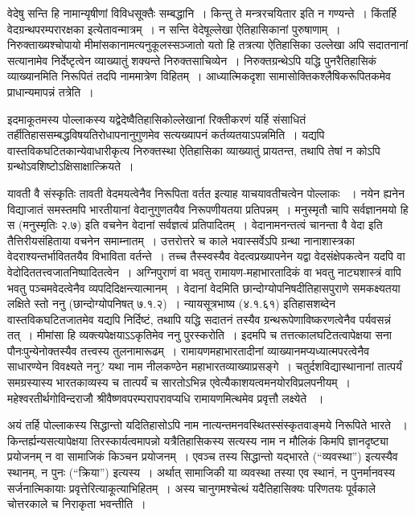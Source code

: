 वेदेषु सन्ति हि नामान्यृषीणां विविधसूक्तैः सम्बद्धानि~। किन्तु ते मन्त्ररचयितार इति न गण्यन्ते~। किंतर्हि वेदग्रन्थपरम्परारक्षका इत्येतावन्मात्रम्~। न सन्ति वेदेषूल्लेखा ऐतिहासिकानां पुरुषाणाम्~। निरुक्ताख्यश्चोपायो मीमांसकानामत्यनुकूलस्सञ्जातो यतो हि तत्रत्या ऐतिहासिका उल्लेखा अपि सदातनानां सत्यानामेव निर्देष्टृत्वेन व्याख्यातुं शक्यन्ते निरुक्तसाचिव्येन~। निरुक्तग्रन्थेऽपि यद्धि पुनरैतिहासिकं व्याख्यानमिति निरूपितं तदपि नाममात्रेण विहितम्~। आध्यात्मिकदृशा सामासोक्तिकश्लैषिकरूपितकमेव प्राधान्यमापन्नं तत्रेति~।

इदमाकूतमस्य पोल्लाकस्य यद्वेदेष्वैतिहासिकोल्लेखानां रिक्तीकरणं यर्हि संसाधितं तर्हीतिहाससम्बद्धविषयतिरोधापनानुगुणमेव सत्यख्यापनं कर्तव्यतयाऽपन्नमिति~।  यद्यपि वास्तविकघटितकान्येवाधारीकृत्य निरुक्तस्था ऐतिहासिका व्याख्यातुं प्रायतन्त, तथापि तेषां न कोऽपि ग्रन्थोऽवशिष्टोऽक्षिसाक्षात्क्रियते~।

यावती वै संस्कृतिः तावती वेदमयत्वेनैव निरूपिता वर्तत इत्याह याचयावतीचत्वेन पोल्लाकः ~। नयेन ह्यनेन विद्याजातं समस्तमपि भारतीयानां वेदानुगुणतयैव निरूपणीयतया प्रतिपन्नम्~। मनुस्मृतौ चापि सर्वज्ञानमयो हि स (मनुस्मृतिः २.७) इति वचनेन वेदानां सर्वज्ञत्वं प्रतिपादितम्~। वेदानामनन्तत्वं चानन्ता वै वेदा इति तैत्तिरीयसंहिताया वचनेन  समाम्नातम्~। उत्तरोत्तरे च काले भवास्सर्वेऽपि ग्रन्था नानाशास्त्रका वेदराश्यन्तर्भाविततयैव विभाविता वर्तन्ते~। तच्च तैस्स्वस्यैव वेदत्वप्रख्यापनेन यद्वा वेदसंक्षेपकत्वेन यदपि वा वेदोदिततत्त्वजातनिष्पादितत्वेन~। अग्निपुराणं वा भवतु रामायण-महाभारतादिकं वा भवतु नाट्यशास्त्रं वापि भवतु पञ्चमवेदत्वेनैव व्यपदिदिक्षन्त्यात्मानम्~। वेदानां वेदमिति छान्दोग्योपनिषदीतिहासपुराणे समकक्ष्यतया लक्षिते स्तो ननु (छान्दोग्योपनिषत् ७.१.२)~। न्यायसूत्रभाष्य (४.१.६१) इतिहासशब्देन वास्तविकघटितजातमेव यद्यपि निर्दिष्टं, तथापि यद्धि सदातनं तस्यैव ग्रन्थरूपेणाविष्करणत्वेनैव पर्यवसन्नं तत्~। मीमांसा हि व्यक्त्यपेक्षयाऽऽकृतिमेव ननु पुरस्करोति~। इदमपि च तत्तत्कालघटितत्वापेक्षया सना पौनःपुन्येनोक्तस्यैव तत्त्वस्य तुलनामारूढम्~। रामायणमहाभारतादीनां व्याख्यानमप्यध्यात्मपरत्वेनैव साधारण्येन विवक्ष्यते ननु? यथा नाम नीलकण्ठेन महाभारतव्याख्याप्रसङ्गे~। चतुर्दशविद्यास्थानानां तात्पर्यं समग्रस्यास्य भारतकाव्यस्य च तात्पर्यं च सारतोऽभिन्न एवेत्यैकाशयत्वमनयोरविप्रलपनीयम्~। महेश्वरतीर्थगोविन्दराजौ श्रीवैष्णवपरम्परापरावप्यधि रामायणमित्थमेव प्रवृत्तौ लक्ष्येते ~।

अयं तर्हि पोल्लाकस्य सिद्धान्तो यदितिहासोऽपि नाम नात्यन्तमनवस्थितस्संस्कृतवाङ्मये निरूपिते भारते ~। किन्तर्ह्यन्यसत्यापेक्षया तिरस्कार्यत्वमापन्नो यत्रैतिहासिकस्य सत्यस्य नाम न मौलिकं किमपि ज्ञानदृष्ट्या प्रयोजनम् न वा सामाजिकं किञ्चन प्रयोजनम्~। एवञ्च तस्य सिद्धान्तो यद्भारते  (“व्यवस्था”) इत्यस्यैव स्थानम्, न पुनः (“क्रिया”) इत्यस्य~। अर्थात् सामाजिकी या व्यवस्था तस्या एव स्थानं, न पुनर्मानवस्य सर्जनात्मिकायाः प्रवृत्तेरित्याकूत्याभिहितम्~। अस्य चानुगमश्चेत्थं यदैतिहासिक्यः परिणतयः  पूर्वकाले चोत्तरकाले च निराकृता भवन्तीति~।



